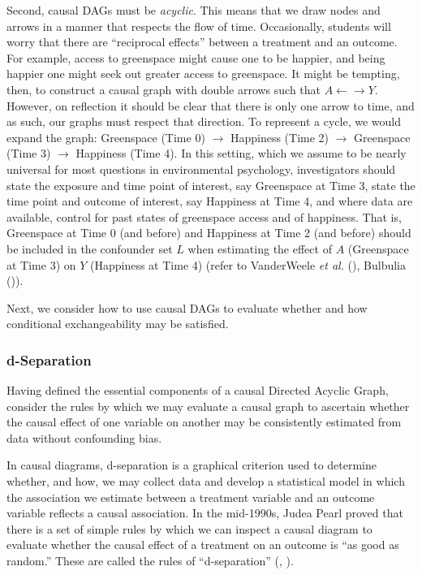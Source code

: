 \documentclass[
  singlecolumn]{article}
\begin{document}
Second, causal DAGs must be \emph{acyclic}. This means that we draw
nodes and arrows in a manner that respects the flow of time.
Occasionally, students will worry that there are ``reciprocal effects''
between a treatment and an outcome. For example, access to greenspace
might cause one to be happier, and being happier one might seek out
greater access to greenspace. It might be tempting, then, to construct a
causal graph with double arrows such that \(A\leftarrow \rightarrow Y\).
However, on reflection it should be clear that there is only one arrow
to time, and as such, our graphs must respect that direction. To
represent a cycle, we would expand the graph: Greenspace (Time 0)
\(\to\) Happiness (Time 2) \(\to\) Greenspace (Time 3) \(\to\) Happiness
(Time 4). In this setting, which we assume to be nearly universal for
most questions in environmental psychology, investigators should state
the exposure and time point of interest, say Greenspace at Time 3, state
the time point and outcome of interest, say Happiness at Time 4, and
where data are available, control for past states of greenspace access
and of happiness. That is, Greenspace at Time 0 (and before) and
Happiness at Time 2 (and before) should be included in the confounder
set \(L\) when estimating the effect of \(A\) (Greenspace at Time 3) on
\(Y\) (Happiness at Time 4) (refer to VanderWeele \emph{et al.}
(), Bulbulia
()).

Next, we consider how to use causal DAGs to evaluate whether and how
conditional exchangeability may be satisfied.

\subsubsection{d-Separation}\label{d-separation}

Having defined the essential components of a causal Directed Acyclic
Graph, consider the rules by which we may evaluate a causal graph to
ascertain whether the causal effect of one variable on another may be
consistently estimated from data without confounding bias.

In causal diagrams, d-separation is a graphical criterion used to
determine whether, and how, we may collect data and develop a
statistical model in which the association we estimate between a
treatment variable and an outcome variable reflects a causal
association. In the mid-1990s, Judea Pearl proved that there is a set of
simple rules by which we can inspect a causal diagram to evaluate
whether the causal effect of a treatment on an outcome is ``as good as
random.'' These are called the rules of ``d-separation''
(,
).
\end{document}
